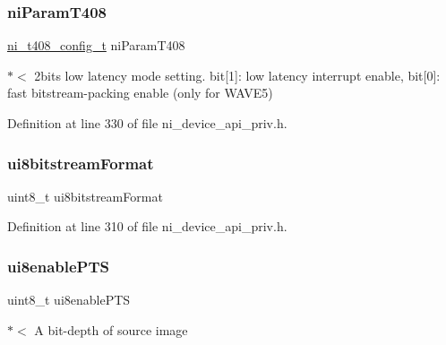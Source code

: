 \mbox{\label{struct__ni__encoder__config__t_a1f7eb1f2672d51cc8a188f83e0cd3e71}} 
\subsubsection{\texorpdfstring{niParamT408}{niParamT408}}
{\footnotesize\ttfamily \mbox{\hyperlink{ni__device__api__priv_8h_ab1c9fee12ac7f38b4a737a0e093b632d}{ni\+\_\+t408\+\_\+config\+\_\+t}} ni\+Param\+T408}

$\ast$$<$ 2bits low latency mode setting. bit\mbox{[}1\mbox{]}\+: low latency interrupt enable, bit\mbox{[}0\mbox{]}\+: fast bitstream-\/packing enable (only for W\+A\+V\+E5) 

Definition at line 330 of file ni\+\_\+device\+\_\+api\+\_\+priv.\+h.

\mbox{\label{struct__ni__encoder__config__t_aff5e012e1cbc8c42ca94222163a4de2c}} 
\subsubsection{\texorpdfstring{ui8bitstreamFormat}{ui8bitstreamFormat}}
{\footnotesize\ttfamily uint8\+\_\+t ui8bitstream\+Format}



Definition at line 310 of file ni\+\_\+device\+\_\+api\+\_\+priv.\+h.

\mbox{\label{struct__ni__encoder__config__t_a48ac4ba8225049e8a09085ba863f8a58}} 
\subsubsection{\texorpdfstring{ui8enablePTS}{ui8enablePTS}}
{\footnotesize\ttfamily uint8\+\_\+t ui8enable\+P\+TS}

$\ast$$<$ A bit-\/depth of source image 

